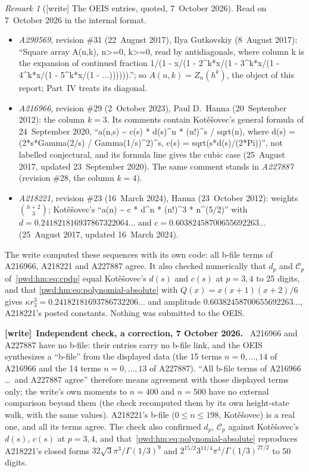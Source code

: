 \documentclass[11pt,letterpaper]{article}
\numberwithin{equation}{section}
\theoremstyle{remark}\newtheorem{remark}[theorem]{Remark}
\newenvironment{writenote}[1][]{\par\smallskip\begingroup\small
 \noindent\textbf{[write]}\if\relax\detokenize{#1}\relax\else~\textbf{#1.}\fi\ }%
 {\par\endgroup\smallskip}
\begin{document}
\begin{remark}[{[write]} The OEIS entries, quoted, 7~October 2026]\label{pwd:hm:rem:oeis}
Read on 7~October 2026 in the internal format.
\begin{itemize}[leftmargin=*]\raggedright
\item \emph{A290569}, revision \#31 (22~August 2017), Ilya Gutkovskiy (8~August
2017): ``Square array A(n,k), n>=0, k>=0, read by antidiagonals, where column k
is the expansion of continued fraction 1/(1 - x/(1 - 2\^{}k*x/(1 - 3\^{}k*x/(1 -
4\^{}k*x/(1 - 5\^{}k*x/(1 - ...)))))).''; so $A(n,k)=Z_n(h^k)$, the object of this
report; Part~IV treats its diagonal.
\item \emph{A216966}, revision \#29 (2~October 2023), Paul D.~Hanna (20~September
2012): the column $k=3$. Its comments contain Kot\v e\v sovec's general
formula of 24~September 2020, ``a(n,s) \textasciitilde{} c(s) * d(s)\^{}n *
(n!)\^{}s / sqrt(n), where d(s) = (2*s*Gamma(2/s) / Gamma(1/s)\^{}2)\^{}s, c(s) =
sqrt(s*d(s)/(2*Pi))'', not labelled conjectural, and its formula line gives
the cubic case (25~August 2017, updated 23~September 2020). The same comment
stands in \emph{A227887} (revision \#28, the column $k=4$).
\item \emph{A218221}, revision \#23 (16~March 2024), Hanna (23~October 2012):
weights $\binom{h+2}3$; Kot\v e\v sovec's ``a(n) \textasciitilde{} c * d\^{}n *
(n!)\^{}3 * n\^{}(5/2)'' with $d=0.241821816937867322064\ldots$ and
$c=0.60382458700655692263\ldots$ (25~August 2017, updated 16~March 2024).
\end{itemize}
The write computed these sequences with its own code: all b-file terms of
A216966, A218221 and A227887 agree. It also checked numerically that $d_p$ and
$\mathcal C_p$ of~\eqref{pwd:hm:eq:cpdp} equal Kot\v e\v sovec's $d(s)$ and
$c(s)$ at $p=3,4$ to 25 digits, and that
\eqref{pwd:hm:eq:polynomial-absolute} with $Q(x)=x(x+1)(x+2)/6$ gives
$\kappa r_3^3=0.24182181693786732206\ldots$ and amplitude
$0.60382458700655692263\ldots$, A218221's posted constants. Nothing was
submitted to the OEIS.
\end{remark}
\begin{writenote}[Independent check, a correction, 7 October 2026]
A216966 and A227887 have no b-file: their entries carry no b-file link, and
the OEIS synthesizes a ``b-file'' from the displayed data (the 15 terms
$n=0,\dots,14$ of A216966 and the 14 terms $n=0,\dots,13$ of A227887). ``All
b-file terms of A216966 \dots\ and A227887 agree'' therefore means agreement
with those displayed terms only; the write's own moments to $n=400$ and
$n=500$ have no external comparison beyond them (the check recomputed them
by its own height-state walk, with the same values). A218221's b-file
($0\le n\le198$, Kot\v e\v sovec) is a real one, and all its terms agree. The
check also confirmed $d_p$, $\mathcal C_p$ against Kot\v e\v sovec's $d(s)$,
$c(s)$ at $p=3,4$, and that~\eqref{pwd:hm:eq:polynomial-absolute} reproduces
A218221's closed forms $32\sqrt3\pi^3/\Gamma(1/3)^9$ and
$2^{15/2}3^{11/4}\pi^4/\Gamma(1/3)^{27/2}$ to 50 digits.
\end{writenote}
\end{document}
